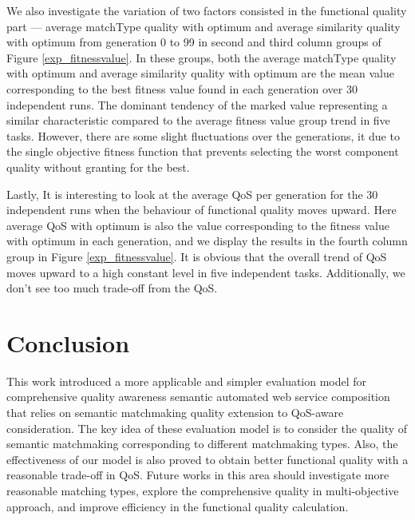 \documentclass{llncs}
\begin{document}
We also investigate the variation of two factors consisted in the functional quality part --- average matchType quality with optimum and average similarity quality with optimum from generation 0 to 99 in second and third column groups of Figure \ref{exp_fitnessvalue}. In these groups,  both the average matchType quality with optimum and average similarity quality with optimum are the mean value corresponding to the best fitness value found in each generation over 30 independent runs. The dominant tendency of the marked value representing a similar characteristic compared to the average fitness value group trend in five tasks. However, there are some slight fluctuations over the generations, it due to the single objective fitness function that prevents selecting the worst component quality without granting for the best.

Lastly, It is interesting to look at the average QoS per generation for the 30 independent runs when the behaviour of functional quality moves upward. Here average QoS with optimum is also the value corresponding to the fitness value with optimum in each generation, and we display the results in the fourth column group in Figure \ref{exp_fitnessvalue}. It is obvious that the overall trend of QoS moves upward to a high constant level in five independent tasks. Additionally, we don't see too much trade-off from the QoS.


\section{Conclusion}\label{conclusion}
This work introduced a more applicable and simpler evaluation model for comprehensive quality awareness semantic automated web service composition that relies on semantic matchmaking quality extension to QoS-aware consideration. The key idea of these evaluation model is to consider the quality of semantic matchmaking corresponding to different matchmaking types. Also, the effectiveness of our model is also proved to obtain better functional quality with a reasonable trade-off in QoS. Future works in this area should investigate more reasonable matching types, explore the comprehensive quality in multi-objective approach, and improve efficiency in the functional quality calculation.


\end{document}
